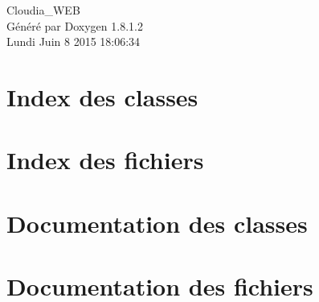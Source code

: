 \documentclass{book}
\begin{document}
\hypersetup{pageanchor=false,citecolor=blue}
\begin{titlepage}
\vspace*{7cm}
\begin{center}
{\Large Cloudia\-\_\-\-W\-E\-B }\\
\vspace*{1cm}
{\large Généré par Doxygen 1.8.1.2}\\
\vspace*{0.5cm}
{\small Lundi Juin 8 2015 18:06:34}\\
\end{center}
\end{titlepage}
\clearemptydoublepage
{}
\tableofcontents
\clearemptydoublepage
{}
\hypersetup{pageanchor=true,citecolor=blue}
\chapter{Index des classes}

\chapter{Index des fichiers}

\chapter{Documentation des classes}



\chapter{Documentation des fichiers}


























































\printindex
\end{document}
